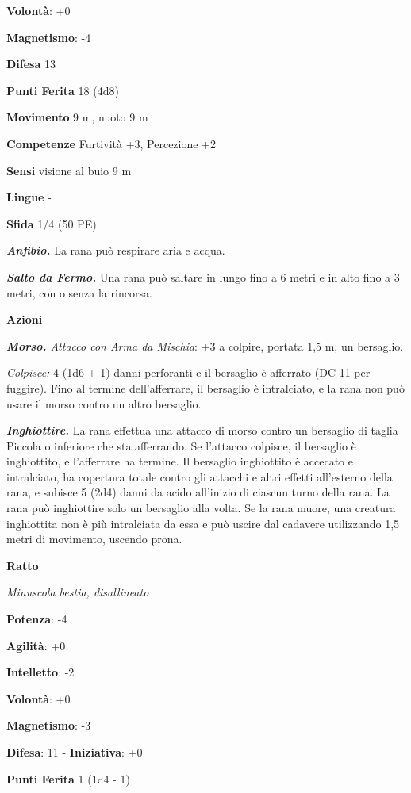 \begin{multicols}{2}
\textbf{Volontà}: +0

\textbf{Magnetismo}: -4

\textbf{Difesa} 13

\textbf{Punti Ferita} 18 (4d8)

\textbf{Movimento} 9 m, nuoto 9 m

\textbf{Competenze} Furtività +3, Percezione +2

\textbf{Sensi} visione al buio 9 m

\textbf{Lingue} -

\textbf{Sfida} 1/4 (50 PE)

\emph{\textbf{Anfibio.}} La rana può respirare aria e acqua.

\emph{\textbf{Salto da Fermo.}} Una rana può saltare in lungo fino a 6
metri e in alto fino a 3 metri, con o senza la rincorsa.

\textbf{Azioni}

\emph{\textbf{Morso.} Attacco con Arma da Mischia}: +3 a colpire,
portata 1,5 m, un bersaglio.

\emph{Colpisce:} 4 (1d6 + 1) danni perforanti e il bersaglio è afferrato
(DC 11 per fuggire). Fino al termine dell'afferrare, il bersaglio è
intralciato, e la rana non può usare il morso contro un altro bersaglio.

\emph{\textbf{Inghiottire.}} La rana effettua una attacco di morso
contro un bersaglio di taglia Piccola o inferiore che sta afferrando. Se
l'attacco colpisce, il bersaglio è inghiottito, e l'afferrare ha
termine. Il bersaglio inghiottito è accecato e intralciato, ha copertura
totale contro gli attacchi e altri effetti all'esterno della rana, e
subisce 5 (2d4) danni da acido all'inizio di ciascun turno della rana.
La rana può inghiottire solo un bersaglio alla volta. Se la rana muore,
una creatura inghiottita non è più intralciata da essa e può uscire dal
cadavere utilizzando 1,5 metri di movimento, uscendo prona.



\textbf{Ratto}

\emph{Minuscola bestia, disallineato}

\textbf{Potenza}: -4

\textbf{Agilità}: +0

\textbf{Intelletto}: -2

\textbf{Volontà}: +0

\textbf{Magnetismo}: -3

\textbf{Difesa}: 11 - \textbf{Iniziativa}: +0

\textbf{Punti Ferita} 1 (1d4 - 1)


\end{multicols}
